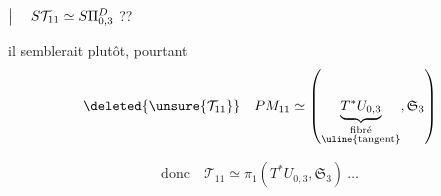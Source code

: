 
 \quad
$\bigm|\quad S\mathcal T_{11}\simeq S\Pi_{0,3}^{D}$ ??

il semblerait plutôt, pourtant
\[
\deleted{\unsure{\mathcal T_{11}}}\quad
PM_{11}\simeq
\left(\underbrace{T^*U_{0,3}}_{\substack{\text{fibré}\\\text{\uline{tangent}}}},\mathfrak S_3\right)
\]

\[
\text{donc}\quad \mathcal T_{11}\simeq\pi_1(T^*U_{0,3},\mathfrak S_3)\ \ldots
\]

